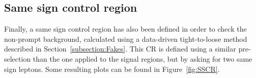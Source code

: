 \documentclass[a4paper, 10pt, openright]{report}
\begin{document}
\subsection{Same sign control region} \label{section:SSCR}

Finally, a same sign control region has also been defined in order to check the non-prompt background, calculated using a data-driven tight-to-loose method described in Section~\ref{subsection:Fakes}. This \ac{CR} is defined using a similar pre-selection than the one applied to the signal regions, but by asking for two same sign leptons. Some resulting plots can be found in Figure~\ref{fig:SSCR}.

\begin{figure}[htbp]
\centering
{}

\end{figure}
\end{document}
